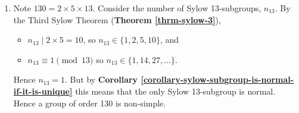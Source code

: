 \begin{enumerate}
    \item Note $130 = 2 \times 5 \times 13$. Consider the number of Sylow 13-subgroups, $n_13$. By the Third Sylow Theorem (\textbf{Theorem \ref{thrm-sylow-3}}),
    \begin{itemize}
        \item $n_13 \mid 2 \times 5 = 10$, so $n_13 \in \{1, 2, 5, 10\}$, and
        \item $n_13 \equiv 1 \pmod{13}$ so $n_13 \in \{1, 14, 27, \dots\}$.
    \end{itemize}
    Hence $n_13 = 1$. But by \textbf{Corollary \ref{corollary-sylow-subgroup-is-normal-if-it-is-unique}} this means that the only Sylow 13-subgroup is normal. Hence a group of order 130 is non-simple.
\end{enumerate}

